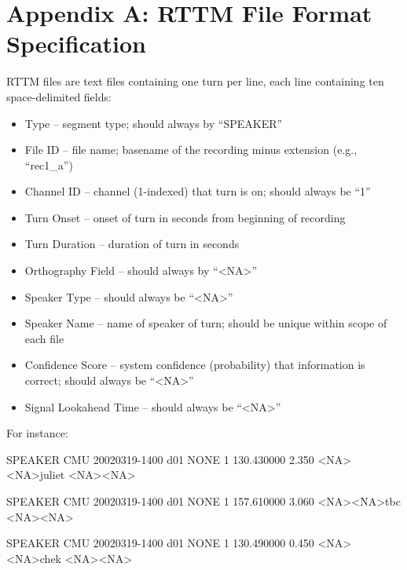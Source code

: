 \chapter{Appendix A: RTTM File Format Specification}

RTTM files are text files containing one turn per line, each line containing ten space-delimited fields:
\begin{itemize}
	\item Type – segment type; should always by “SPEAKER”
	\item File ID – file name; basename of the recording minus extension (e.g., “rec1\_a”)
	\item Channel ID – channel (1-indexed) that turn is on; should always be “1”
	\item Turn Onset – onset of turn in seconds from beginning of recording
	\item Turn Duration – duration of turn in seconds
	\item Orthography Field – should always by “\textless NA\textgreater”
	\item Speaker Type – should always be “\textless NA\textgreater”
	\item Speaker Name – name of speaker of turn; should be unique within scope of each file
	\item Confidence Score – system confidence (probability) that information is correct; should always be “\textless NA\textgreater”
	\item Signal Lookahead Time – should always be “\textless NA\textgreater”
\end{itemize}



For instance:
\small

SPEAKER CMU 20020319-1400 d01 NONE 1 130.430000 2.350 \textless NA\textgreater \textless NA\textgreater juliet \textless NA\textgreater \textless NA\textgreater

SPEAKER CMU 20020319-1400 d01 NONE 1 157.610000 3.060 \textless NA\textgreater \textless NA\textgreater tbc \textless NA\textgreater \textless NA\textgreater

SPEAKER CMU 20020319-1400 d01 NONE 1 130.490000 0.450 \textless NA\textgreater \textless NA\textgreater chek \textless NA\textgreater \textless NA\textgreater


